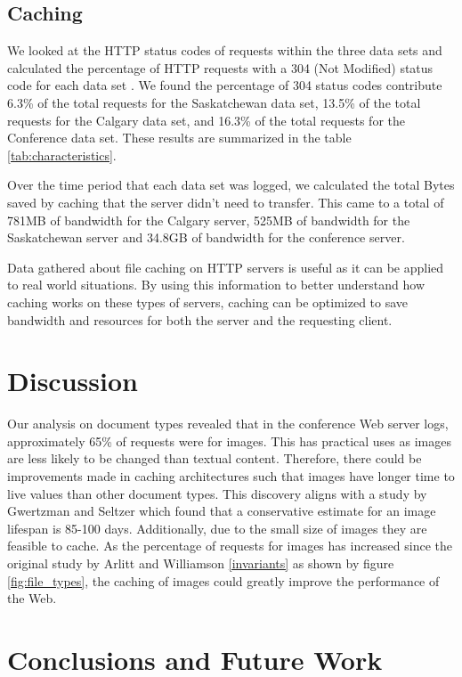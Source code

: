 \documentclass[10pt,conference]{IEEEtran}
\begin{document}
\subsection{Caching} %
\label{sub:caching}
We looked at the HTTP status codes of requests within the three data sets and calculated the percentage of HTTP requests with a 304 (Not Modified) status code for each data set . We found the percentage of 304 status codes contribute 6.3\% of the total requests for the Saskatchewan data set, 13.5\% of the total requests for the Calgary data set, and 16.3\% of the total requests for the Conference data set. These results are summarized in the table \ref{tab:characteristics}.

Over the time period that each data set was logged, we calculated the total  Bytes saved by caching that the server didn’t need to transfer. This came to a total of 781MB of bandwidth for the Calgary server, 525MB of bandwidth for the Saskatchewan server and 34.8GB of bandwidth for the conference server.

Data gathered about file caching on HTTP servers is useful as it can be applied to real world situations. By using this information to better understand how caching works on these types of servers, caching can be optimized to save bandwidth and resources for both the server and the requesting client.


\section{Discussion}\label{discussion}
Our analysis on document types revealed that in the conference Web server logs, approximately 65\% of requests were for images. This has practical uses as images are less likely to be changed than textual content. Therefore, there could be improvements made in caching architectures such that images have longer time to live values than other document types. This discovery aligns with a study by Gwertzman and Seltzer \cite{Gwertzman} which found that a conservative estimate for an image lifespan is 85-100 days. Additionally, due to the small size of images they are feasible to cache. As the percentage of requests for images has increased since the original study by Arlitt and Williamson \ref{invariants} as shown by figure \ref{fig:file_types}, the caching of images could greatly improve the performance of the Web.

\section{Conclusions and Future Work}\label{conclusions}



\end{document}
